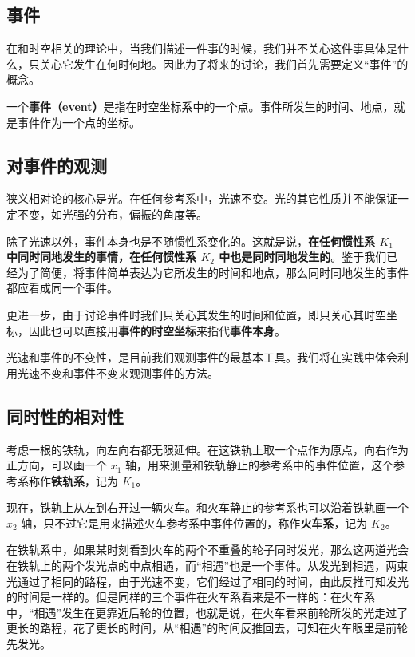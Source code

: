 

\subsection{事件}

在和时空相关的理论中，当我们描述一件事的时候，我们并不关心这件事具体是什么，只关心它发生在何时何地。因此为了将来的讨论，我们首先需要定义“事件”的概念。

一个\textbf{事件（event）}是指在时空坐标系中的一个点。事件所发生的时间、地点，就是事件作为一个点的坐标。

\subsection{对事件的观测}

狭义相对论的核心是光。在任何参考系中，光速不变。光的其它性质并不能保证一定不变，如光强的分布，偏振的角度等。

除了光速以外，事件本身也是不随惯性系变化的。这就是说，\textbf{在任何惯性系 $K_1$ 中同时同地发生的事情，在任何惯性系 $K_2$ 中也是同时同地发生的}。鉴于我们已经为了简便，将事件简单表达为它所发生的时间和地点，那么同时同地发生的事件都应看成同一个事件。

更进一步，由于讨论事件时我们只关心其发生的时间和位置，即只关心其时空坐标，因此也可以直接用\textbf{事件的时空坐标}来指代\textbf{事件本身}。

光速和事件的不变性，是目前我们观测事件的最基本工具。我们将在实践中体会利用光速不变和事件不变来观测事件的方法。

\subsection{同时性的相对性}

考虑一根的铁轨，向左向右都无限延伸。在这铁轨上取一个点作为原点，向右作为正方向，可以画一个 $x_1$ 轴，用来测量和铁轨静止的参考系中的事件位置，这个参考系称作\textbf{铁轨系}，记为 $K_1$。

现在，铁轨上从左到右开过一辆火车。和火车静止的参考系也可以沿着铁轨画一个 $x_2$ 轴，只不过它是用来描述火车参考系中事件位置的，称作\textbf{火车系}，记为 $K_2$。

在铁轨系中，如果某时刻看到火车的两个不重叠的轮子同时发光，那么这两道光会在铁轨上的两个发光点的中点相遇，而“相遇”也是一个事件。从发光到相遇，两束光通过了相同的路程，由于光速不变，它们经过了相同的时间，由此反推可知发光的时间是一样的。但是同样的三个事件在火车系看来是不一样的：在火车系中，“相遇”发生在更靠近后轮的位置，也就是说，在火车看来前轮所发的光走过了更长的路程，花了更长的时间，从“相遇”的时间反推回去，可知在火车眼里是前轮先发光。


